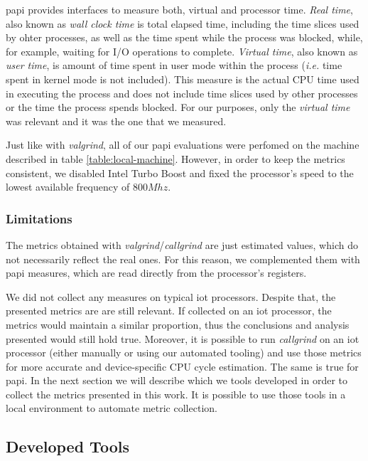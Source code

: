 \gls{papi} provides interfaces to measure both, virtual and processor time. \textit{Real time},
also known as \textit{wall clock time} is total elapsed time, including the time slices used
by ohter processes, as well as the time spent while the process was blocked, while, for example,
waiting for I/O operations to complete. \textit{Virtual time}, also known as \textit{user time},
is amount of time spent in user mode within the process (\textit{i.e.} time spent in kernel mode is not included). 
This measure is the actual CPU time used in executing the process and does not include time slices 
used by other processes or the time the process spends blocked. For our purposes, only the \textit{virtual time}
was relevant and it was the one that we measured.

Just like with \textit{valgrind}, all of our \gls{papi} evaluations were perfomed on the machine
described in table \ref{table:local-machine}. However, in order to keep the metrics consistent,
we disabled Intel Turbo Boost \cite{charles2009evaluation} and fixed the processor's speed to the lowest available frequency
of $800Mhz$.

\subsubsection{Limitations}

The metrics obtained with \textit{valgrind}/\textit{callgrind} are just estimated values, which do not
necessarily reflect the real ones. For this reason, we complemented them with \gls{papi} measures, which
are read directly from the processor's registers.

We did not collect any measures on typical \gls{iot} processors. Despite that, the presented metrics are are still
relevant. If collected on an \gls{iot} processor, the metrics would maintain a similar proportion, thus
the conclusions and analysis presented would still hold true. Moreover, it is possible to run \textit{callgrind}
on an \gls{iot} processor (either manually or using our automated tooling) and use those metrics for more accurate 
and device-specific CPU cycle estimation. The same is true for \gls{papi}. In the next section we will describe which we tools developed in order 
to collect the metrics presented in this work. It is possible to use those tools in a local environment to 
automate metric collection.

\subsection{Developed Tools} \label{sec:developed-tools}


